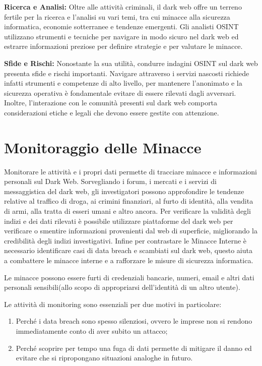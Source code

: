 \textbf{Ricerca e Analisi:} Oltre alle attività criminali, il dark web offre un terreno fertile per la ricerca e l'analisi su vari temi, tra cui minacce alla sicurezza informatica, economie sotterranee e tendenze emergenti. Gli analisti OSINT utilizzano strumenti e tecniche per navigare in modo sicuro nel dark web ed estrarre informazioni preziose per definire strategie e per valutare le minacce.

\textbf{Sfide e Rischi:} Nonostante la sua utilità, condurre indagini OSINT sul dark web presenta sfide e rischi importanti. Navigare attraverso i servizi nascosti richiede infatti strumenti e competenze di alto livello, per mantenere l'anonimato e la sicurezza operativa è fondamentale evitare di essere rilevati dagli avversari. Inoltre, l'interazione con le comunità presenti sul dark web comporta considerazioni etiche e legali che devono essere gestite con attenzione.


\section{Monitoraggio delle Minacce}\label{sec:cap_sec_impl1}

Monitorare le attività e i propri dati permette di tracciare minacce e informazioni personali sul Dark Web.
Sorvegliando i forum, i mercati e i servizi di messaggistica del dark web, gli investigatori possono approfondire le tendenze relative al traffico di droga, ai crimini finanziari, al furto di identità, alla vendita di armi, alla tratta di esseri umani e altro ancora. 
Per verificare la validità degli indizi e dei dati rilevati è possibile utilizzare piattaforme del dark web per verificare o smentire informazioni provenienti dal web di superficie, migliorando la credibilità degli indizi investigativi. Infine per contrastare le Minacce Interne è necessario identificare casi di data breach e scambiati sul dark web, questo aiuta a combattere le minacce interne e a rafforzare le misure di sicurezza informatica.

Le minacce possono essere furti di credenziali bancarie, numeri, email e altri dati personali sensibili(allo scopo di appropriarsi dell'identità di un altro utente). 

Le attività di monitoring sono essenziali per due motivi in particolare:
\begin{enumerate}
    \item Perché i data breach sono spesso silenziosi, ovvero le imprese non si rendono immediatamente conto di aver subito un attacco;  
    \item Perché scoprire per tempo una fuga di dati permette di mitigare il danno ed evitare che si ripropongano situazioni analoghe in futuro.
\end{enumerate}

